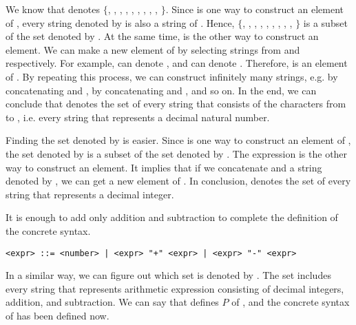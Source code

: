 We know that  denotes
$\{$, , , , ,
, , , , $\}$.
Since  is one way to construct an element of , every
string denoted by  is also a string of . Hence,
$\{$, , , , ,
, , , , $\}$
is a subset of the set denoted by . At the same time, 
 is the other way to construct an element. We can make a new element
of  by selecting strings from  and 
respectively. For example,  can denote , and
 can denote . Therefore,  is an element of
. By repeating this process, we can construct infinitely many
strings, e.g.  by concatenating  and ,
 by concatenating  and , and so on. In the
end, we can conclude that  denotes the set of every string that
consists of the characters from  to , i.e. every string that
represents a decimal natural number.

Finding the set denoted by  is easier. Since  is one
way to construct an element of , the set denoted by 
is a subset of the set denoted by . The expression   is
the other way to construct an element. It implies that if we concatenate
 and a string denoted by , we can get a new element of
. In conclusion,  denotes the set of every string
that represents a decimal integer.

It is enough to add only addition and subtraction to complete the definition of
the concrete syntax.

\begin{verbatim}
<expr> ::= <number> | <expr> "+" <expr> | <expr> "-" <expr>
\end{verbatim}

In a similar way, we can figure out which set is denoted by . The
set includes every string that represents arithmetic expression consisting of
decimal integers, addition, and subtraction. We can say that 
defines $P$ of \lang, and the concrete syntax of \lang has been defined now.

